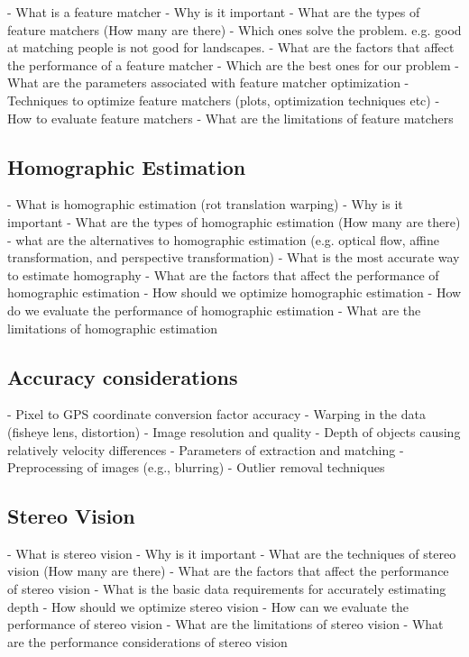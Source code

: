 - What is a feature matcher
- Why is it important
- What are the types of feature matchers (How many are there)
- Which ones solve the problem. e.g. good at matching people is not good for landscapes.
- What are the factors that affect the performance of a feature matcher
- Which are the best ones for our problem
- What are the parameters associated with feature matcher optimization
- Techniques to optimize feature matchers (plots, optimization techniques etc)
- How to evaluate feature matchers
- What are the limitations of feature matchers


\subsection{Homographic Estimation} 
- What is homographic estimation (rot translation warping)
- Why is it important
- What are the types of homographic estimation (How many are there)
- what are the alternatives to homographic estimation (e.g. optical flow, affine transformation, and perspective transformation)
- What is the most accurate way to estimate homography
- What are the factors that affect the performance of homographic estimation    
- How should we optimize homographic estimation
- How do we evaluate the performance of homographic estimation
- What are the limitations of homographic estimation

\subsection*{Accuracy considerations}
- Pixel to GPS coordinate conversion factor accuracy
- Warping in the data (fisheye lens, distortion)
- Image resolution and quality
- Depth of objects causing relatively velocity differences
- Parameters of extraction and matching
- Preprocessing of images (e.g., blurring)
- Outlier removal techniques

\subsection*{Stereo Vision}
- What is stereo vision
- Why is it important
- What are the techniques of stereo vision (How many are there)
- What are the factors that affect the performance of stereo vision
- What is the basic data requirements for accurately estimating depth
- How should we optimize stereo vision
- How can we evaluate the performance of stereo vision
- What are the limitations of stereo vision
- What are the performance considerations of stereo vision




